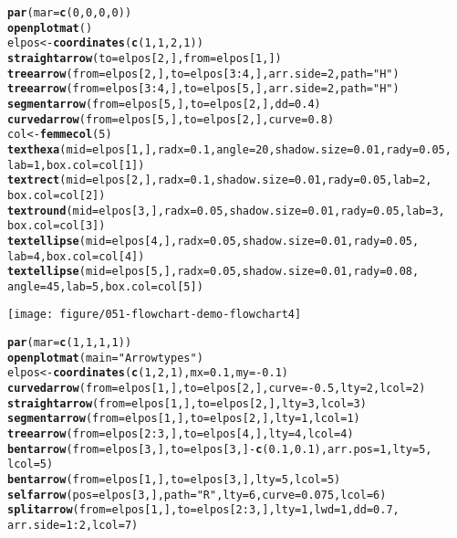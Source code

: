 \documentclass{article}\usepackage[]{graphicx}\usepackage[]{color}
\makeatletter
\def\maxwidth{ %
  \ifdim\Gin@nat@width>\linewidth
    \linewidth
  \else
    \Gin@nat@width
  \fi
}
\newcommand{\hlfunctioncall}[1]{\textcolor[rgb]{0.501960784313725,0,0.329411764705882}{\textbf{#1}}}%
\newcommand{\hlstring}[1]{\textcolor[rgb]{0.6,0.6,1}{#1}}%
\newenvironment{kframe}{%
 \def\at@end@of@kframe{}%
 \ifinner\ifhmode%
  \def\at@end@of@kframe{\end{minipage}}%
  \begin{minipage}{\columnwidth}%
 \fi\fi%
 \def\FrameCommand##1{\hskip\@totalleftmargin \hskip-\fboxsep
 \colorbox{shadecolor}{##1}\hskip-\fboxsep
     \hskip-\linewidth \hskip-\@totalleftmargin \hskip\columnwidth}%
 \MakeFramed {\advance\hsize-\width
   \@totalleftmargin\z@ \linewidth\hsize
   \@setminipage}}%
 {\par\unskip\endMakeFramed%
 \at@end@of@kframe}
\newenvironment{knitrout}{}{} %
\makeatother
\begin{document}
\begin{knitrout}
\begin{kframe}
\begin{alltt}
\hlfunctioncall{par}(mar = \hlfunctioncall{c}(0, 0, 0, 0))
\hlfunctioncall{openplotmat}()
elpos <- \hlfunctioncall{coordinates}(\hlfunctioncall{c}(1, 1, 2, 1))
\hlfunctioncall{straightarrow}(to = elpos[2, ], from = elpos[1, ])
\hlfunctioncall{treearrow}(from = elpos[2, ], to = elpos[3:4, ], arr.side = 2, path = \hlstring{"H"})
\hlfunctioncall{treearrow}(from = elpos[3:4, ], to = elpos[5, ], arr.side = 2, path = \hlstring{"H"})
\hlfunctioncall{segmentarrow}(from = elpos[5, ], to = elpos[2, ], dd = 0.4)
\hlfunctioncall{curvedarrow}(from = elpos[5, ], to = elpos[2, ], curve = 0.8)
col <- \hlfunctioncall{femmecol}(5)
\hlfunctioncall{texthexa}(mid = elpos[1, ], radx = 0.1, angle = 20, shadow.size = 0.01, rady = 0.05, 
    lab = 1, box.col = col[1])
\hlfunctioncall{textrect}(mid = elpos[2, ], radx = 0.1, shadow.size = 0.01, rady = 0.05, lab = 2, 
    box.col = col[2])
\hlfunctioncall{textround}(mid = elpos[3, ], radx = 0.05, shadow.size = 0.01, rady = 0.05, lab = 3, 
    box.col = col[3])
\hlfunctioncall{textellipse}(mid = elpos[4, ], radx = 0.05, shadow.size = 0.01, rady = 0.05, 
    lab = 4, box.col = col[4])
\hlfunctioncall{textellipse}(mid = elpos[5, ], radx = 0.05, shadow.size = 0.01, rady = 0.08, 
    angle = 45, lab = 5, box.col = col[5])
\end{alltt}
\end{kframe}
\texttt{[image: figure/051-flowchart-demo-flowchart4]} 
\begin{kframe}\begin{alltt}



\hlfunctioncall{par}(mar = \hlfunctioncall{c}(1, 1, 1, 1))
\hlfunctioncall{openplotmat}(main = \hlstring{"Arrowtypes"})
elpos <- \hlfunctioncall{coordinates}(\hlfunctioncall{c}(1, 2, 1), mx = 0.1, my = -0.1)
\hlfunctioncall{curvedarrow}(from = elpos[1, ], to = elpos[2, ], curve = -0.5, lty = 2, lcol = 2)
\hlfunctioncall{straightarrow}(from = elpos[1, ], to = elpos[2, ], lty = 3, lcol = 3)
\hlfunctioncall{segmentarrow}(from = elpos[1, ], to = elpos[2, ], lty = 1, lcol = 1)
\hlfunctioncall{treearrow}(from = elpos[2:3, ], to = elpos[4, ], lty = 4, lcol = 4)
\hlfunctioncall{bentarrow}(from = elpos[3, ], to = elpos[3, ] - \hlfunctioncall{c}(0.1, 0.1), arr.pos = 1, lty = 5, 
    lcol = 5)
\hlfunctioncall{bentarrow}(from = elpos[1, ], to = elpos[3, ], lty = 5, lcol = 5)
\hlfunctioncall{selfarrow}(pos = elpos[3, ], path = \hlstring{"R"}, lty = 6, curve = 0.075, lcol = 6)
\hlfunctioncall{splitarrow}(from = elpos[1, ], to = elpos[2:3, ], lty = 1, lwd = 1, dd = 0.7, 
    arr.side = 1:2, lcol = 7)


\end{alltt}
\end{kframe}
\end{knitrout}
\end{document}

